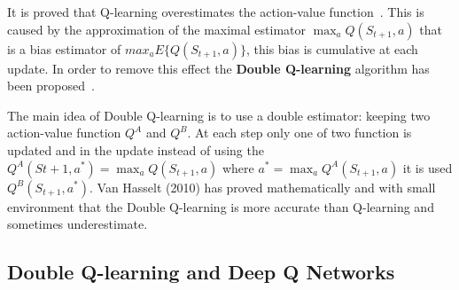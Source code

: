 It is proved that Q-learning overestimates the action-value function~\cite{NIPS2010_3964}. This is caused by the approximation of the maximal estimator $\max_a Q(S_{t+1}, a)$ that is a bias estimator of $max_a E \{ Q(S_{t+1}, a) \}$, this bias is cumulative at each update. In order to remove this effect the \textbf{Double Q-learning} algorithm has been proposed~\cite{NIPS2010_3964}.

The main idea of Double Q-learning is to use a double estimator: keeping two action-value function $Q^A$ and $Q^B$. At each step only one of two function is updated and in the update instead of using the $Q^A(S{t+1}, a^*) = \max_a Q(S_{t+1}, a)$ where $a^* = \max_a Q^A(S_{t+1}, a)$ it is used $Q^B(S_{t+1}, a^*)$.
Van Hasselt (2010) has proved mathematically and with small environment that the Double Q-learning is more accurate than Q-learning and sometimes underestimate.

\subsection{Double Q-learning and Deep Q Networks}

